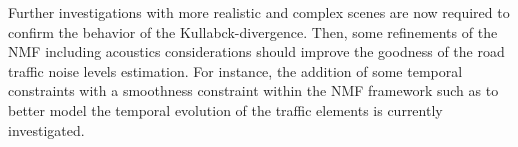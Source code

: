 \documentclass{article}
\begin{document}
\begin{sloppy}
Further investigations with more realistic and complex scenes are now required to confirm the behavior of the Kullabck-divergence. Then, some refinements of the NMF including acoustics considerations should improve the goodness of the road traffic noise levels estimation. For instance, the addition of some temporal constraints with a smoothness constraint within the NMF framework such as \cite{fevotteSmooth} \cite{Essid} \cite{virtanenSmooth} to better model the temporal evolution of the traffic elements is currently investigated.




%
%
%
%
%
%

\end{sloppy}
\end{document}
